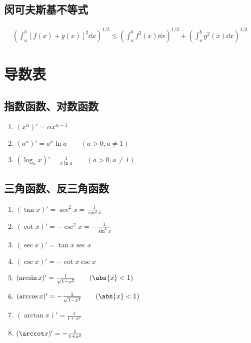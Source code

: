 \subsection{闵可夫斯基不等式}
\begin{align}
    \label{eq:闵可夫斯基不等式}
    \left( \int_a^b[f(x)+g(x)]^2\dd{x} \right)^{1/2}
    \leq
    \left( \int_a^bf^2(x)\dd{x} \right)^{1/2} +\left( \int_a^bg^2(x)\dd{x} \right)^{1/2}
\end{align}

\newpage
\section{导数表}
\subsection{指数函数、对数函数}
\begin{multicols}{2}
    \begin{enumerate}
        \item $(x^\alpha)' = \alpha x^{\alpha-1}$
        \item $(a^x)' = a^x\ln a \qquad (a>0, a\neq 1)$
        \item $(\log_a x)' = \frac{1}{x\ln a} \qquad(a>0,a\neq 1)$
    \end{enumerate}
\end{multicols}

\subsection{三角函数、反三角函数}
\begin{multicols}{2}
    \begin{enumerate}
        \item $(\tan x)' =  \sec^2 x =  \frac{1}{\cos^2 x}$
        \item $(\cot x)' = -\csc^2 x = -\frac{1}{\sin^2 x}$
        \item $(\sec x)' =  \tan x\sec x$
        \item $(\csc x)' = -\cot x\csc x$
        \item $(\arcsin x)' = \frac{1}{\sqrt{1-x^2}} \qquad (\abs{x} < 1)$
        \item $(\arccos x)' =-\frac{1}{\sqrt{1-x^2}} \qquad (\abs{x} < 1)$
        \item $(\arctan x)' = \frac{1}{1+x^2}$
        \item $(\arccot x)' =-\frac{1}{1+x^2}$
    \end{enumerate}
\end{multicols}

